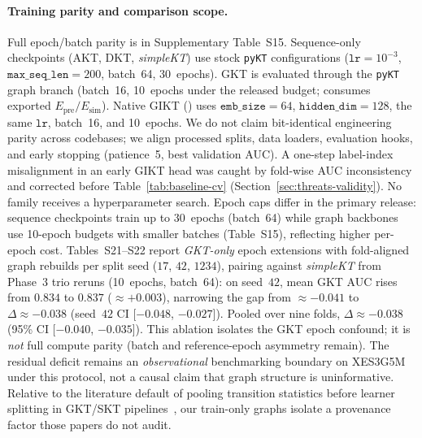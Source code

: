 \documentclass[pdflatex,sn-mathphys-num]{sn-jnl}
\newcommand{\Epre}{\ensuremath{E_{\text{pre}}}}
\newcommand{\Esim}{\ensuremath{E_{\text{sim}}}}
\newcommand{\GKTthirtydeltavec}{-0.038}
\newcommand{\GKTthirtydeltaci}{[$-0.040$, $-0.035$]}
\newcommand{\GKTthirtyseedFortydeltaci}{[$-0.048$, $-0.027$]}
\newcommand{\GKTepochgain}{+0.003}
\begin{document}
\paragraph{Training parity and comparison scope.}
Full epoch/batch parity is in Supplementary Table~S15.
Sequence-only checkpoints (AKT, DKT, \textit{simpleKT}) use stock
\texttt{pyKT} configurations ($\texttt{lr}{=}10^{-3}$,
$\texttt{max\_seq\_len}{=}200$, batch~64, 30~epochs). GKT is evaluated
through the \texttt{pyKT} graph branch (batch~16, 10~epochs under the
released budget; consumes exported $\Epre/\Esim$). Native GIKT
() uses $\texttt{emb\_size}{=}64$,
$\texttt{hidden\_dim}{=}128$, the same $\texttt{lr}$, batch~16, and
10~epochs. We do not claim bit-identical engineering parity across codebases;
we align processed splits, data loaders, evaluation hooks, and early stopping
(patience~5, best validation AUC). A one-step label-index misalignment in an
early GIKT head was caught by fold-wise AUC inconsistency and corrected before
Table~\ref{tab:baseline-cv} (Section~\ref{sec:threats-validity}). No family
receives a hyperparameter search. Epoch caps differ in the primary release:
sequence checkpoints train up to 30~epochs (batch~64) while graph backbones
use 10-epoch budgets with smaller batches (Table~S15), reflecting higher
per-epoch cost. Tables~S21--S22 report \emph{GKT-only} epoch extensions with
fold-aligned graph rebuilds per split seed ($17$, $42$, $1234$), pairing
against \textit{simpleKT} from Phase~3 trio reruns (10~epochs, batch~64): on
seed~$42$, mean GKT AUC rises from $0.834$ to $0.837$
(${\approx}\GKTepochgain{}$), narrowing the gap from ${\approx}{-}0.041$ to
$\Delta{\approx}{-}0.038$ (seed~$42$ CI \GKTthirtyseedFortydeltaci{}).
Pooled over nine folds, $\Delta{\approx}\GKTthirtydeltavec{}$ (95\% CI
\GKTthirtydeltaci{}). This ablation isolates the GKT epoch confound; it is
\emph{not} full compute parity (batch and reference-epoch asymmetry remain).
The residual deficit remains an \emph{observational} benchmarking boundary on
XES3G5M under this protocol, not a causal claim that graph structure is
uninformative. Relative to the literature default of pooling transition statistics before
learner splitting in GKT/SKT pipelines~\cite{nakagawa2019gkt,tong2020skt}, our
train-only graphs isolate a provenance factor those papers do not audit.
\end{document}
